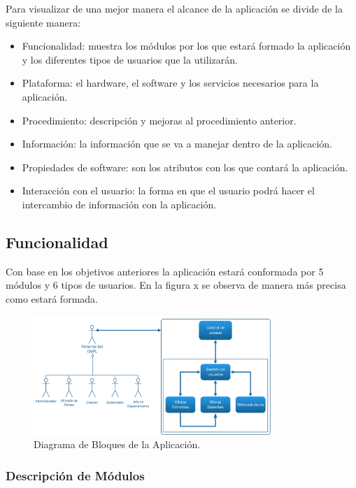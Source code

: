 Para visualizar de una mejor manera el alcance de la aplicación se divide de la siguiente manera: \\

\begin{itemize}
	\item Funcionalidad: muestra los módulos por los que estará formado la aplicación y los diferentes tipos de usuarios que la utilizarán.
	\item Plataforma: el hardware, el software y los servicios necesarios para la aplicación.
	\item Procedimiento: descripción y mejoras al procedimiento anterior.
	\item Información: la información que se va a manejar dentro de la aplicación.
	\item Propiedades de software: son los atributos con los que contará la aplicación.
	\item Interacción con el usuario: la forma en que el usuario podrá hacer el intercambio de información con la aplicación.
\end{itemize}


\subsection{Funcionalidad}

Con base en los objetivos anteriores la aplicación estará conformada por 5 módulos y 6 tipos de usuarios. En la figura x se observa de manera más precisa como estará formada. \\ 

	\begin{figure}[htbp!]
		\centering
			\includegraphics[width=0.8\textwidth]{images/propuesta/diagramabloques}
		\caption{Diagrama de Bloques de la Aplicación.}
	\end{figure}

\subsubsection{Descripción de Módulos}
